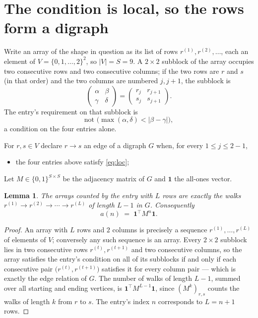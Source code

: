 \documentclass[11pt,a4paper]{article}
\theoremstyle{plain}
\newtheorem{lemma}[theorem]{Lemma}
\theoremstyle{definition}
\begin{document}
\section{The condition is local, so the rows form a digraph}

Write an array of the shape in question as its list of rows
$r^{(1)},r^{(2)},\dots$, each an element of
$V=\{0,1,\dots,2\}^{2}$, so $|V|=S=9$. A $2\times2$ subblock of the array
occupies two consecutive rows and two consecutive columns; if the two rows are $r$
and $s$ (in that order) and the two columns are numbered $j,j+1$,
the subblock is
\[
\begin{pmatrix}\alpha&\beta\\\gamma&\delta\end{pmatrix}=\begin{pmatrix}r_j&r_{j+1}\\s_j&s_{j+1}\end{pmatrix}.
\]
The entry's requirement on that subblock is
\begin{equation}\label{eq:loc}
\text{not }\bigl(\max(\alpha,\delta)<|\beta-\gamma|\bigr),
\end{equation}
a condition on the four entries alone.

For $r,s\in V$ declare $r\to s$ an edge of a digraph $G$ when, for every
$1\le j\le 2-1$,
\begin{itemize}
\item the four entries above satisfy \eqref{eq:loc};

\end{itemize}
Let $M\in\{0,1\}^{S\times S}$ be the adjacency matrix of $G$ and $\mathbf{1}$ the
all-ones vector.

\begin{lemma}\label{lem:walk}
The arrays counted by the entry with $L$ rows are exactly the walks
$r^{(1)}\to r^{(2)}\to\cdots\to r^{(L)}$ of length $L-1$ in $G$. Consequently
\[
a(n)\;=\;\mathbf{1}^{\!\top}M^{n}\mathbf{1} .
\]
\end{lemma}

\begin{proof}
An array with $L$ rows and $2$ columns is precisely a sequence
$r^{(1)},\dots,r^{(L)}$ of elements of $V$; conversely any such sequence is an array.
Every $2\times2$ subblock lies in two consecutive rows $r^{(t)},r^{(t+1)}$ and two
consecutive columns, so the array satisfies the entry's condition on all of its subblocks
if and only if each consecutive pair $\bigl(r^{(t)},r^{(t+1)}\bigr)$ satisfies it for
every column pair --- which is exactly the edge relation of $G$. The number of walks of
length $L-1$, summed over all starting and ending vertices, is
$\mathbf{1}^{\!\top}M^{L-1}\mathbf{1}$, since $(M^{k})_{r,s}$ counts the walks of
length $k$ from $r$ to $s$. The entry's index $n$ corresponds to $L=n+1$ rows.
\end{proof}
\end{document}
